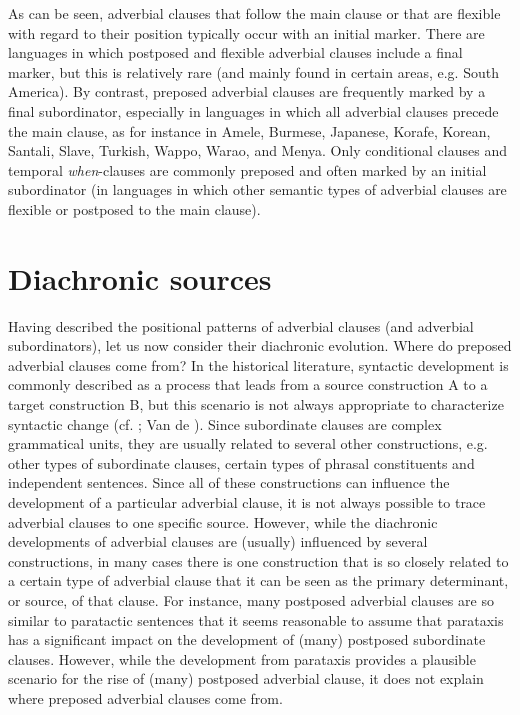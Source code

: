 \documentclass[output=paper]{langsci/langscibook}
\begin{document}
As can be seen, adverbial clauses that follow the main clause or that are flexible with regard to their position typically occur with an initial marker. There are languages in which postposed and flexible adverbial clauses include a final marker, but this is relatively rare (and mainly found in certain areas, e.g. South America). By contrast, preposed adverbial clauses are frequently marked by a final subordinator, especially in languages in which all adverbial clauses precede the main clause, as for instance in Amele, Burmese, Japanese, Korafe, Korean, Santali, Slave, Turkish, Wappo, Warao, and Menya. Only conditional clauses and temporal \textit{when}-clauses are commonly preposed and often marked by an initial subordinator (in languages in which other semantic types of adverbial clauses are flexible or postposed to the main clause). 

\section{Diachronic sources}

Having described the positional patterns of adverbial clauses (and adverbial subordinators), let us now consider their diachronic evolution. Where do preposed adverbial clauses come from? In the historical literature, syntactic development is commonly described as a process that leads from a source construction A to a target construction B, but this scenario is not always appropriate to characterize syntactic change (cf. \citealt{Givón1991}; Van de \citealt{VeldeEtAl2013}). Since subordinate clauses are complex grammatical units, they are usually related to several other constructions, e.g. other types of subordinate clauses, certain types of phrasal constituents and independent sentences. Since all of these constructions can influence the development of a particular adverbial clause, it is not always possible to trace adverbial clauses to one specific source. However, while the diachronic developments of adverbial clauses are (usually) influenced by several constructions, in many cases there is one construction that is so closely related to a certain type of adverbial clause that it can be seen as the primary determinant, or source, of that clause. For instance, many postposed adverbial clauses are so similar to paratactic sentences that it seems reasonable to assume that parataxis has a significant impact on the development of (many) postposed subordinate clauses. However, while the development from parataxis provides a plausible scenario for the rise of (many) postposed adverbial clause, it does not explain where preposed adverbial clauses come from.
\end{document}
